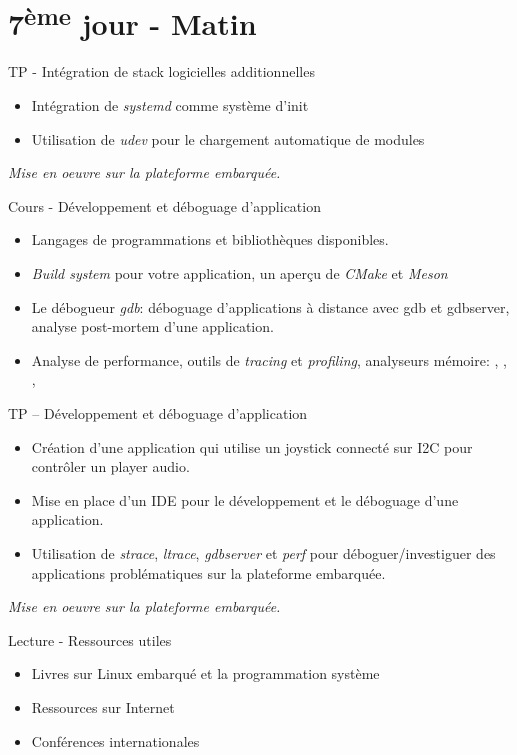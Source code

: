 \documentclass[a4paper,12pt,obeyspaces,spaces,hyphens]{article}
\begin{document}
\section{7\textsuperscript{ème} jour - Matin}

\feagendaonecolumn
{TP - Intégration de stack logicielles additionnelles}
{
  \begin{itemize}
  \item Intégration de {\em systemd} comme système d'init
  \item Utilisation de {\em udev} pour le chargement automatique de
    modules
  \end{itemize}

  \vspace{0.5cm}
  {\em Mise en oeuvre sur la plateforme embarquée.}
}

\feagendaonecolumn
{Cours - Développement et déboguage d'application}
{
  \begin{itemize}
  \item Langages de programmations et bibliothèques disponibles.
  \item {\em Build system} pour votre application, un aperçu de {\em
      CMake} et {\em Meson}
  \item Le débogueur {\em gdb}: déboguage d'applications à distance
    avec gdb et gdbserver, analyse post-mortem d'une application.
  \item Analyse de performance, outils de {\em tracing} et {\em
      profiling}, analyseurs mémoire: , ,
    , 
  \end{itemize}
}

\feagendaonecolumn
{TP – Développement et déboguage d'application}
{
  \begin{itemize}
  \item Création d'une application qui utilise un joystick connecté
    sur I2C pour contrôler un player audio.
  \item Mise en place d'un IDE pour le développement et le déboguage
    d'une application.
  \item Utilisation de {\em strace}, {\em ltrace}, {\em gdbserver} et
    {\em perf} pour déboguer/investiguer des applications
    problématiques sur la plateforme embarquée.
  \end{itemize}
  {\em Mise en oeuvre sur la plateforme embarquée.}
}

\feagendaonecolumn
{Lecture - Ressources utiles}
{
  \begin{itemize}
  \item Livres sur Linux embarqué et la programmation système
  \item Ressources sur Internet
  \item Conférences internationales
  \end{itemize}
}
\end{document}
